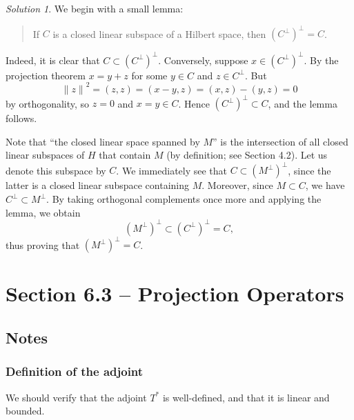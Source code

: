 \documentclass{report}
\newcommand{\norm}[1]{{\lVert #1 \rVert}}
\theoremstyle{remark}
\newtheorem*{solution}{Solution}
\begin{document}
\begin{solution}
  We begin with a small lemma:
  \begin{quote}
    If $C$ is a closed linear subspace of a Hilbert space, then $(C^\perp)^\perp = C$.
  \end{quote}
  Indeed, it is clear that $C \subset (C^\perp)^\perp$. Conversely, suppose $x \in (C^\perp)^\perp$. By the projection theorem $x = y + z$ for some $y \in C$ and $z \in C^\perp$. But
  \begin{equation*}
    \norm{z}^2 = (z,z) = (x-y,z) = (x,z) - (y,z) = 0
  \end{equation*}
  by orthogonality, so $z = 0$ and $x = y \in C$. Hence $(C^\perp)^\perp \subset C$, and the lemma follows.

  Note that ``the closed linear space spanned by $M$'' is the intersection of all closed linear subspaces of $H$ that contain $M$ (by definition; see Section 4.2). Let us denote this subspace by $C$. We immediately see that $C \subset (M^\perp)^\perp$, since the latter is a closed linear subspace containing $M$. Moreover, since $M \subset C$, we have $C^\perp \subset M^\perp$. By taking orthogonal complements once more and applying the lemma, we obtain
  \begin{equation*}
    (M^\perp)^\perp \subset (C^\perp)^\perp = C,
  \end{equation*}
  thus proving that $(M^\perp)^\perp = C$.
\end{solution}


\section*{Section 6.3 -- Projection Operators}

\subsection*{Notes}

\subsubsection*{Definition of the adjoint}
We should verify that the adjoint $T^*$ is well-defined, and that it is linear and bounded.
\end{document}
